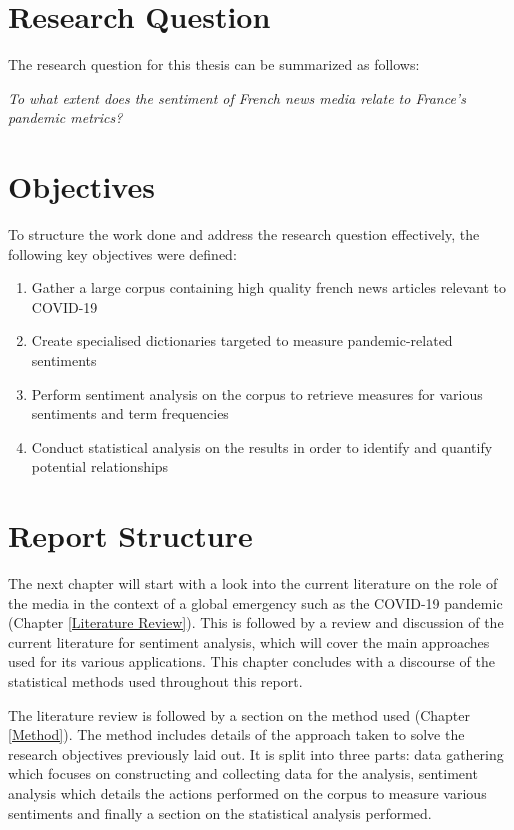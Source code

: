 \section{Research Question}\label{chap: Research Question}

The research question for this thesis can be summarized as follows:

\begin{center}
    \emph{To what extent does the sentiment of French news media relate to France's pandemic metrics?}
\end{center}

\section{Objectives}\label{chap: Research Objectives}
To structure the work done and address the research question effectively, the following key objectives were defined:
\begin{enumerate}
    \item Gather a large corpus containing high quality french news articles relevant to COVID-19
    \item Create specialised dictionaries targeted to measure pandemic-related sentiments
    \item Perform sentiment analysis on the corpus to retrieve measures for various sentiments and term frequencies
    \item Conduct statistical analysis on the results in order to identify and quantify potential relationships
\end{enumerate}

\section{Report Structure}\label{Report Structure}

The next chapter will start with a look into the current literature on the role of the media in the context of a global emergency such as the COVID-19 pandemic (Chapter \ref{Literature Review}). This is followed by a review and discussion of the current literature for sentiment analysis, which will cover the main approaches used for its various applications. This chapter concludes with a discourse of the statistical methods used throughout this report.

The literature review is followed by a section on the method used (Chapter \ref{Method}). The method includes details of the approach taken to solve the research objectives previously laid out. It is split into three parts: data gathering which focuses on constructing and collecting data for the analysis, sentiment analysis which details the actions performed on the corpus to measure various sentiments and finally a section on the statistical analysis performed.

